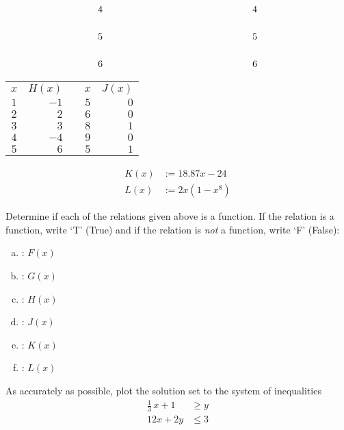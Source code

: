 \documentclass[12pt,letterpaper]{exam}
\begin{document}
\begin{questions}
\[\begin{tikzpicture}
	\node at (-0.3,1) {$4$};
	\node at (-0.3,0) {$5$};
	\node at (-0.3,-1) {$6$};
	
	\node at (5.4,1) {$4$};
	\node at (5.4,0) {$5$};
	\node at (5.4,-1) {$6$};
	\end{tikzpicture}
	\] \pspace

	\begin{minipage}[b]{0.49\textwidth}
	\centering
	\begin{tabular}{c|rcc|r}
	$x$ & $H(x)$ & \hspace{1cm} & $x$ & $J(x)$ \\ \cline{1-2} \cline{4-5}
	$1$ & $-1$ & & $5$ & $0$ \\
	$2$ & $2$ & & $6$ & $0$ \\
	$3$ & $3$ & & $8$ & $1$ \\
	$4$ & $-4$ & & $9$ & $0$ \\
	$5$ & $6$ & & $5$ & $1$
	\end{tabular}
	\end{minipage}
	\begin{minipage}[b]{0.49\textwidth}
	\[
	\begin{aligned}
	K(x)&:= 18.87x - 24 \\[0.6cm]
	L(x)&:= 2x(1 - x^8)
	\end{aligned}
	\]
	\end{minipage} \pvspace{0.6cm}
	
Determine if each of the relations given above is a function. If the relation is a function, write `T' (True) and if the relation is \emph{not} a function, write `F' (False): \pspace

	\begin{enumerate}[(a)]
	\item {}: $F(x)$ \pvspace{0.3cm}
	\item {}: $G(x)$ \pvspace{0.3cm}
	\item {}: $H(x)$ \pvspace{0.3cm}
	\item {}: $J(x)$ \pvspace{0.3cm}
	\item {}: $K(x)$ \pvspace{0.3cm}
	\item {}: $L(x)$
	\end{enumerate}





\newpage
\question[10] As accurately as possible, plot the solution set to the system of inequalities
	\[
	\begin{aligned}
	\frac{1}{3}\,x + 1&\geq y  \\
	12x + 2y &\leq 3 
	\end{aligned}
	\] \pspace


\end{questions}
\end{document}
